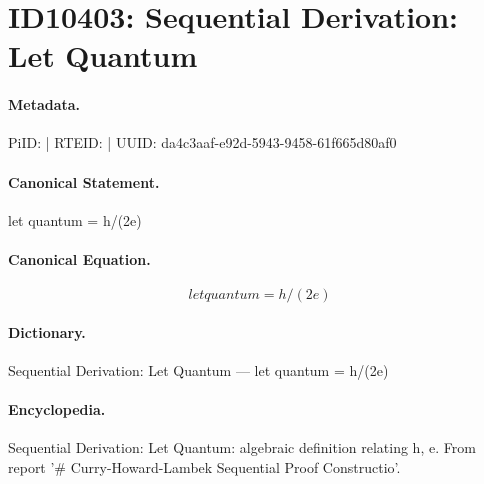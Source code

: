\section*{ID10403: Sequential Derivation: Let Quantum}
\paragraph{Metadata.}
PiID:  | RTEID:  | UUID: da4c3aaf-e92d-5943-9458-61f665d80af0

\paragraph{Canonical Statement.}
let quantum = h/(2e)

\paragraph{Canonical Equation.}
\[
let quantum = h/(2e)
\]

\paragraph{Dictionary.}
Sequential Derivation: Let Quantum — let quantum = h/(2e)

\paragraph{Encyclopedia.}
Sequential Derivation: Let Quantum: algebraic definition relating h, e. From report '\# Curry-Howard-Lambek Sequential Proof Constructio'.
